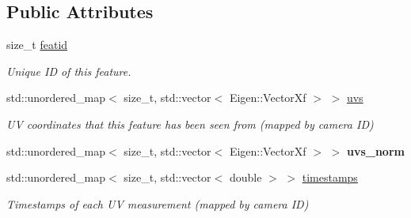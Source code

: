 \subsection*{Public Attributes}
\begin{DoxyCompactItemize}
\item 
\mbox{\label{structov__msckf_1_1UpdaterHelper_1_1UpdaterHelperFeature_a36ac27ddf140e21720d08dbce50b25ec}} 
size\+\_\+t \hyperlink{structov__msckf_1_1UpdaterHelper_1_1UpdaterHelperFeature_a36ac27ddf140e21720d08dbce50b25ec}{featid}
\begin{DoxyCompactList}\small\item\em Unique ID of this feature. \end{DoxyCompactList}\item 
\mbox{\label{structov__msckf_1_1UpdaterHelper_1_1UpdaterHelperFeature_ac8371fba9fe2bc7238d90176032892da}} 
std\+::unordered\+\_\+map$<$ size\+\_\+t, std\+::vector$<$ Eigen\+::\+Vector\+Xf $>$ $>$ \hyperlink{structov__msckf_1_1UpdaterHelper_1_1UpdaterHelperFeature_ac8371fba9fe2bc7238d90176032892da}{uvs}
\begin{DoxyCompactList}\small\item\em UV coordinates that this feature has been seen from (mapped by camera ID) \end{DoxyCompactList}\item 
\mbox{\label{structov__msckf_1_1UpdaterHelper_1_1UpdaterHelperFeature_af53aeb3043a029de724b564a2bc9d2d8}} 
std\+::unordered\+\_\+map$<$ size\+\_\+t, std\+::vector$<$ Eigen\+::\+Vector\+Xf $>$ $>$ {\bfseries uvs\+\_\+norm}
\item 
\mbox{\label{structov__msckf_1_1UpdaterHelper_1_1UpdaterHelperFeature_a7f9c2dcc7f4855e7034a0f3dcc964d9d}} 
std\+::unordered\+\_\+map$<$ size\+\_\+t, std\+::vector$<$ double $>$ $>$ \hyperlink{structov__msckf_1_1UpdaterHelper_1_1UpdaterHelperFeature_a7f9c2dcc7f4855e7034a0f3dcc964d9d}{timestamps}
\begin{DoxyCompactList}\small\item\em Timestamps of each UV measurement (mapped by camera ID) \end{DoxyCompactList}\item 

\end{DoxyCompactItemize}
